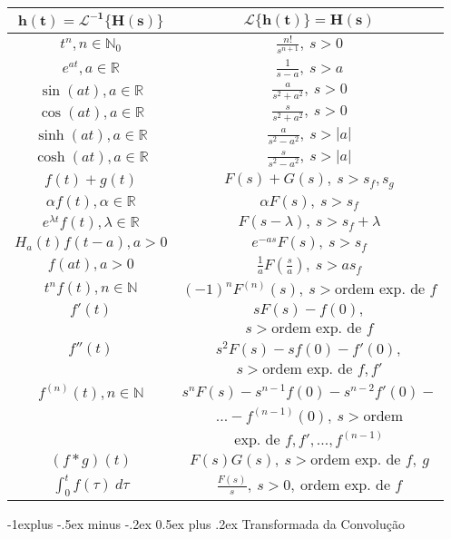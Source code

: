\documentclass[10pt,landscape]{article}
\makeatletter
\newcommand{\Lagr}{\mathcal{L}}
\renewcommand{\subsection}{\@startsection{subsection}{2}{0mm}%
                                {-1explus -.5ex minus -.2ex}%
                                {0.5ex plus .2ex}%
                                {\normalfont\normalsize\bfseries}}
\makeatother
\begin{document}
\begin{multicols}{3}
\bgroup
\def\arraystretch{1.5}
\begin{tabular}{|c|c|}
\hline
$\mathbf{h(t) = \Lagr^{-1}\{H(s)\}}$ & $\mathbf{\Lagr\{h(t)\} = H(s)}$ \\
\hline
$t^n, n \in \mathbb{N}_0$ & $\frac{n!}{s^{n+1}},\ s > 0$ \\
\hline
$e^{at}, a \in \mathbb{R}$ & $\frac{1}{s-a},\ s > a$ \\
\hline
$\sin(at), a \in \mathbb{R}$ & $\frac{a}{s^2 + a^2},\ s > 0$ \\
\hline
$\cos(at), a \in \mathbb{R}$ & $\frac{s}{s^2 + a^2},\ s > 0$ \\
\hline
$\sinh(at), a \in \mathbb{R}$ & $\frac{a}{s^2 - a^2},\ s > |a|$\\
\hline
$\cosh(at), a \in \mathbb{R}$ & $\frac{s}{s^2 - a^2},\ s > |a|$\\
\hline
$f(t) + g(t)$ & $F(s) + G(s),\ s > s_f, s_g$\\
\hline
$\alpha f(t), \alpha \in \mathbb{R}$ & $\alpha F(s),\ s > s_f$ \\
\hline
$e^{\lambda t} f(t), \lambda \in \mathbb{R}$ & $F(s-\lambda),\ s > s_f + \lambda$ \\
\hline
$H_a(t)f(t-a), a > 0$ & $e^{-as}F(s),\ s > s_f$ \\
\hline
$f(at), a > 0$ & $\frac{1}{a}F(\frac{s}{a}),\ s > as_f$ \\
\hline
$t^n f(t), n \in \mathbb{N}$ & $(-1)^n F^{(n)}(s),\ s > \text{ordem exp. de } f$\\
\hline
$f'(t)$ & $sF(s) - f(0),$\\
$ $ & $s > \text{ordem exp. de } f$\\
\hline
$f''(t)$ & $s^2 F(s) - sf(0) - f'(0),$\\
$ $ & $s > \text{ordem exp. de } f, f'$\\
\hline
$f^{(n)}(t), n \in \mathbb{N}$ & $s^n F(s) - s^{n-1} f(0) - s^{n-2} f'(0) - $\\
$ $ & $... - f^{(n-1)}(0),\ s > \text{ordem}$\\
$ $ & $\text{exp. de } f, f', ..., f^{(n-1)}$\\
\hline
$(f*g)(t)$ & $F(s)G(s),\ s > \text{ordem exp. de }f,\ g$\\
\hline
$\int_0^t f(\tau)\ d\tau$ & $\frac{F(s)}{s},\ s > 0,\ \text{ordem exp. de }f$\\
\hline
\end{tabular}
\egroup

\subsection{Transformada da Convolução}


\end{multicols}
\end{document}

